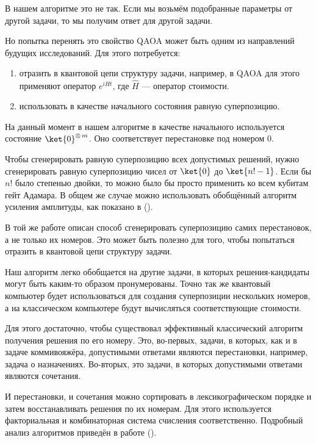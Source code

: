 В нашем алгоритме это не так. Если мы возьмём подобранные параметры от другой задачи, то мы получим ответ для другой задачи.

Но попытка перенять это свойство QAOA может быть одним из направлений будущих исследований. Для этого потребуется:

\begin{enumerate}
    \item отразить в квантовой цепи структуру задачи, например, в QAOA для этого применяют оператор $e^{i \hat H t}$, где $\hat H$ --- оператор стоимости.
    
    \item использовать в качестве начального состояния равную суперпозицию.
\end{enumerate}

На данный момент в нашем алгоритме в качестве начального используется состояние $\ket{0}^{\otimes\, m}$. Оно соответствует перестановке под номером 0. 

Чтобы сгенерировать равную суперпозицию всех допустимых решений, нужно сгенерировать равную суперпозицию чисел от $\ket{0}$ до $\ket{n!-1}$. Если бы $n!$ было степенью двойки, то можно было бы просто применить ко всем кубитам гейт Адамара. В общем же случае можно использовать обобщённый алгоритм усиления амплитуды, как показано в \cite{perms} (\citeyear{perms}). 

В той же работе \cite{perms} описан способ сгенерировать суперпозицию самих перестановок, а не только их номеров. Это может быть полезно для того, чтобы попытаться отразить в квантовой цепи структуру задачи.


Наш алгоритм легко обобщается на другие задачи, в которых решения-кандидаты могут быть каким-то образом пронумерованы. Точно так же квантовый компьютер будет использоваться для создания суперпозиции нескольких номеров, а на классическом компьютере будут вычисляться соответствующие стоимости.

Для этого достаточно, чтобы существовал эффективный классический алгоритм получения решения по его номеру. Это, во-первых, задачи, в которых, как и в задаче коммивояжёра, допустимыми ответами являются перестановки, например, задача о назначениях. Во-вторых, это задачи, в которых допустимыми ответами являются сочетания. 

И перестановки, и сочетания можно сортировать в лексикографическом порядке и затем восстанавливать решения по их номерам. 
Для этого используется факториальная и комбинаторная система счисления соответственно.
Подробный анализ алгоритмов приведён в работе \cite{Combinations} (\citeyear{Combinations}).

